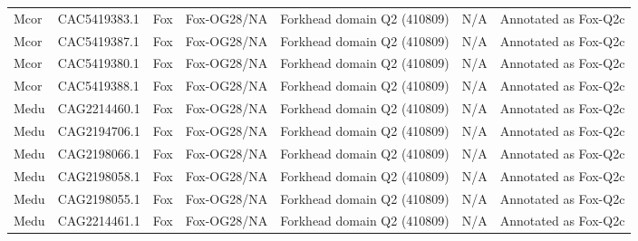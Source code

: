 \documentclass[../main.tex]{subfiles}
\begin{document}
\begin{landscape}
\begin{longtable}{lllllll}
		Mcor           & CAC5419383.1          & Fox            & Fox-OG28/NA         & Forkhead domain Q2 (410809)                 & N/A                                                                    & Annotated as Fox-Q2c \\
		Mcor           & CAC5419387.1          & Fox            & Fox-OG28/NA         & Forkhead domain Q2 (410809)                 & N/A                                                                    & Annotated as Fox-Q2c \\
		Mcor           & CAC5419380.1          & Fox            & Fox-OG28/NA         & Forkhead domain Q2 (410809)                 & N/A                                                                    & Annotated as Fox-Q2c \\
		Mcor           & CAC5419388.1          & Fox            & Fox-OG28/NA         & Forkhead domain Q2 (410809)                 & N/A                                                                    & Annotated as Fox-Q2c \\
		Medu           & CAG2214460.1          & Fox            & Fox-OG28/NA         & Forkhead domain Q2 (410809)                 & N/A                                                                    & Annotated as Fox-Q2c \\
		Medu           & CAG2194706.1          & Fox            & Fox-OG28/NA         & Forkhead domain Q2 (410809)                 & N/A                                                                    & Annotated as Fox-Q2c \\
		Medu           & CAG2198066.1          & Fox            & Fox-OG28/NA         & Forkhead domain Q2 (410809)                 & N/A                                                                    & Annotated as Fox-Q2c \\
		Medu           & CAG2198058.1          & Fox            & Fox-OG28/NA         & Forkhead domain Q2 (410809)                 & N/A                                                                    & Annotated as Fox-Q2c \\
		Medu           & CAG2198055.1          & Fox            & Fox-OG28/NA         & Forkhead domain Q2 (410809)                 & N/A                                                                    & Annotated as Fox-Q2c \\
		Medu           & CAG2214461.1          & Fox            & Fox-OG28/NA         & Forkhead domain Q2 (410809)                 & N/A                                                                    & Annotated as Fox-Q2c \\

\end{longtable}
\end{landscape}
\end{document}
